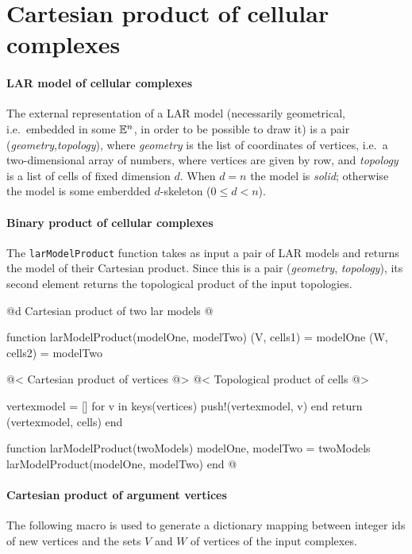 \section{Cartesian product of cellular complexes} \label{sec:product}

\paragraph{LAR model of cellular complexes}

The external representation of a LAR model (necessarily geometrical, i.e.~embedded in some $\mathbb{E}^n$, in order to be possible to draw it) is a pair (\emph{geometry},\emph{topology}), where \emph{geometry} is the list of coordinates of vertices, i.e.~a two-dimensional array of numbers, where vertices are given by row, and \emph{topology} is a list of cells of fixed dimension $d$. When $d=n$ the model is \emph{solid}; otherwise  the model is some emberdded $d$-skeleton ($0\leq d <n$).

\paragraph{Binary product of cellular complexes}
The \texttt{larModelProduct} function takes as input a pair of LAR models and returns the model of their Cartesian product. Since this is a pair (\emph{geometry}, \emph{topology}), its second element returns the topological product of the input topologies.

@d Cartesian product of two lar models  
@{function larModelProduct(modelOne, modelTwo)
    (V, cells1) = modelOne
    (W, cells2) = modelTwo

    @< Cartesian product of vertices @>
    @< Topological product of cells    @>

    vertexmodel = []
    for v in keys(vertices)
        push!(vertexmodel, v)
    end
    return (vertexmodel, cells)
end

function larModelProduct(twoModels)
    modelOne, modelTwo = twoModels
    larModelProduct(modelOne, modelTwo)
end
@}

\paragraph{Cartesian product of argument vertices}
The following macro is used to generate a dictionary mapping between integer ids of new vertices and the sets $V$ and $W$ of vertices of the input complexes.

